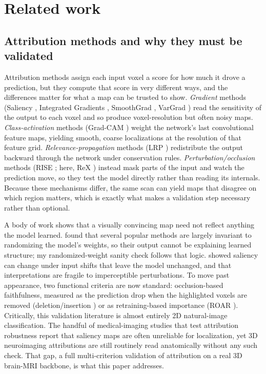 \documentclass[11pt]{article}
\begin{document}
\section{Related work}

\subsection{Attribution methods and why they must be validated}
Attribution methods assign each input voxel a score for how much it drove a prediction, but
they compute that score in very different ways, and the differences matter for what a map can
be trusted to show. \emph{Gradient} methods (Saliency \citep{simonyan2014}, Integrated Gradients
\citep{sundararajan2017}, SmoothGrad \citep{smilkov2017}, VarGrad \citep{adebayo2018}) read
the sensitivity of the output to each voxel and so produce voxel-resolution but often noisy
maps. \emph{Class-activation} methods (Grad-CAM \citep{selvaraju2017}) weight the network's
last convolutional feature maps, yielding smooth, coarse localizations at the resolution of
that feature grid. \emph{Relevance-propagation} methods (LRP \citep{bach2015}) redistribute
the output backward through the network under conservation rules. \emph{Perturbation/occlusion}
methods (RISE \citep{petsiuk2018}; here, ReX \citep{chockler2024rex}) instead mask parts of the
input and watch the prediction move, so they test the model directly rather than reading its
internals. Because these mechanisms differ, the same scan can yield maps that disagree on
which region matters, which is exactly what makes a validation step necessary rather than
optional.

A body of work shows that a visually convincing map need not reflect anything the model
learned. \citet{adebayo2018} found that several popular methods are largely invariant to
randomizing the model's weights, so their output cannot be explaining learned structure; my
randomized-weight sanity check follows that logic. \citet{kindermans2019} showed saliency can
change under input shifts that leave the model unchanged, and \citet{ghorbani2019} that
interpretations are fragile to imperceptible perturbations. To move past appearance, two
functional criteria are now standard: occlusion-based faithfulness, measured as the
prediction drop when the highlighted voxels are removed (deletion/insertion
\citep{petsiuk2018}) or as retraining-based importance (ROAR \citep{hooker2019}). Critically,
this validation literature is almost entirely 2D natural-image classification. The handful of
medical-imaging studies that test attribution robustness
\citep{eitel2019,arun2021} report that saliency maps are often unreliable for localization,
yet 3D neuroimaging attributions are still routinely read anatomically without any such check.
That gap, a full multi-criterion validation of attribution on a real 3D brain-MRI
backbone, is what this paper addresses.
\end{document}
